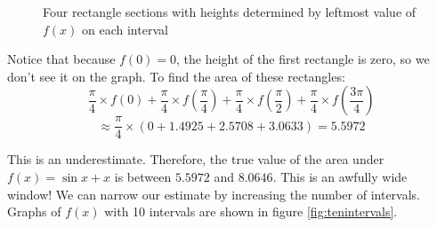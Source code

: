 \begin{figure}[htbp]
	\centering
	\caption{Four rectangle sections with heights determined by leftmost value of $f(x)$ on each interval}
	\label{fig:sineleft}
\end{figure}

Notice that because $f(0)=0$, the height of the first rectangle is zero, so we don't see it on the graph. To find the area of these rectangles:
$$\frac{\pi}{4} \times f(0) + \frac{\pi}{4} \times f(\frac{\pi}{4}) + \frac{\pi}{4} \times f(\frac{\pi}{2}) + \frac{\pi}{4} \times f(\frac{3\pi}{4})$$
$$\approx \frac{\pi}{4} \times (0 + 1.4925 + 2.5708 + 3.0633)=5.5972$$

This is an underestimate. Therefore, the true value of the area under $f(x) = \sin{x} +x$ is between $5.5972$ and $8.0646$. This is an awfully wide window! We can narrow our estimate by increasing the number of intervals. Graphs of $f(x)$ with 10 intervals are shown in figure \ref{fig:tenintervals}.


